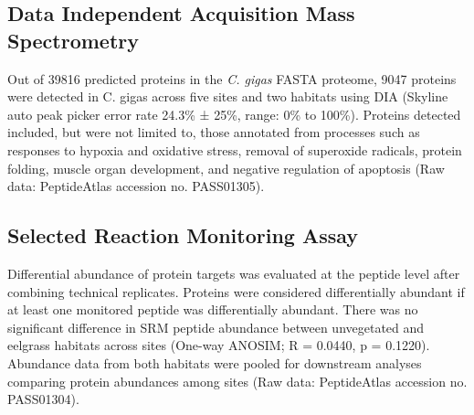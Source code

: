 \documentclass [11pt, proquest] {uwthesis}[2015/03/03]
\begin{document}
\hypertarget{data-independent-acquisition-mass-spectrometry-1}{%
\subsection{Data Independent Acquisition Mass Spectrometry}\label{data-independent-acquisition-mass-spectrometry-1}}

Out of 39816 predicted proteins in the \emph{C. gigas} FASTA proteome, 9047 proteins were detected in C. gigas across five sites and two habitats using DIA (Skyline auto peak picker error rate 24.3\% ± 25\%, range: 0\% to 100\%). Proteins detected included, but were not limited to, those annotated from processes such as responses to hypoxia and oxidative stress, removal of superoxide radicals, protein folding, muscle organ development, and negative regulation of apoptosis (Raw data: PeptideAtlas accession no. PASS01305).

\hypertarget{selected-reaction-monitoring-assay-1}{%
\subsection{Selected Reaction Monitoring Assay}\label{selected-reaction-monitoring-assay-1}}

Differential abundance of protein targets was evaluated at the peptide level after combining technical replicates. Proteins were considered differentially abundant if at least one monitored peptide was differentially abundant. There was no significant difference in SRM peptide abundance between unvegetated and eelgrass habitats across sites (One-way ANOSIM; R = 0.0440, p = 0.1220). Abundance data from both habitats were pooled for downstream analyses comparing protein abundances among sites (Raw data: PeptideAtlas accession no. PASS01304).
\end{document}
